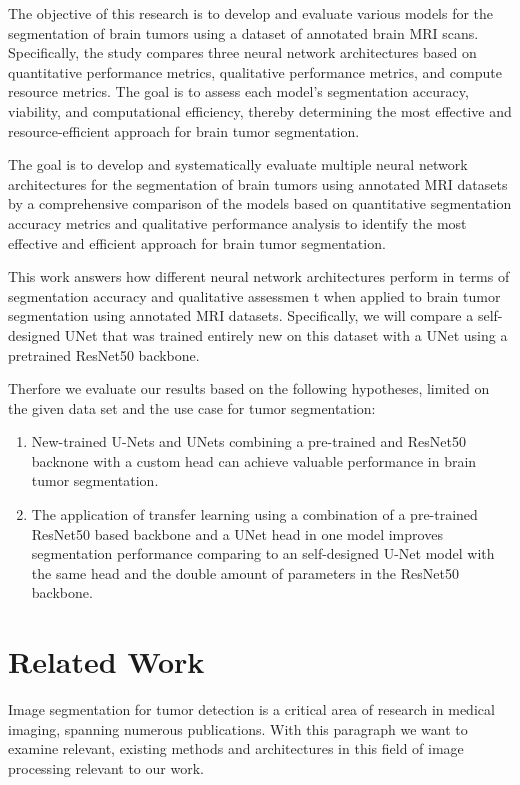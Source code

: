 \documentclass[lettersize,journal]{IEEEtran}
\begin{document}
The objective of this research is to develop and evaluate various models for the segmentation of brain tumors using a dataset of annotated brain MRI scans. Specifically, the study compares three neural network architectures based on quantitative performance metrics, qualitative performance metrics, and compute resource metrics. The goal is to assess each model's segmentation accuracy, viability, and computational efficiency, thereby determining the most effective and resource-efficient approach for brain tumor segmentation.

The goal is to develop and systematically evaluate multiple neural network architectures for the segmentation of brain tumors using annotated MRI datasets by a comprehensive comparison of the models based on quantitative segmentation accuracy metrics and qualitative performance analysis to identify the most effective and efficient approach for brain tumor segmentation.

This work answers how different neural network architectures perform in terms of segmentation accuracy and qualitative assessmen%
t when applied to brain tumor segmentation using annotated MRI datasets. Specifically, we will compare a self-designed UNet that was trained entirely new on this dataset with a UNet using a pretrained ResNet50 backbone.

Therfore we evaluate our results based on the following hypotheses, limited on the given data set and the use case for tumor segmentation:
\begin{enumerate}
  \item New-trained U-Nets and UNets combining a pre-trained and ResNet50 backnone with a custom head can achieve valuable performance in brain tumor segmentation.
  \item The application of transfer learning using a combination of a pre-trained ResNet50 based backbone and a UNet head in one model improves segmentation performance comparing to an self-designed U-Net model with the same head and the double amount of parameters in the ResNet50 backbone.
\end{enumerate}




\section{Related Work}
Image segmentation for tumor detection is a critical area of research in medical imaging, spanning numerous publications. With this paragraph we want to examine relevant, existing methods and architectures in this field of image processing relevant to our work.
\end{document}
